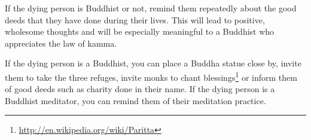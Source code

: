 If the dying person is Buddhist or not, remind them repeatedly about the good deeds that they have done during their lives. This will lead to positive, wholesome thoughts and will be especially meaningful to a Buddhist who appreciates the law of kamma.

If the dying person is a Buddhist, you can place a Buddha statue close by, invite them to take the three refuges, invite monks to chant blessings\footnote{\url{ http://en.wikipedia.org/wiki/Paritta}} or inform them of good deeds such as charity done in their name. If the dying person is a Buddhist meditator, you can remind them of their meditation \color{blue} practice\color{black}.
